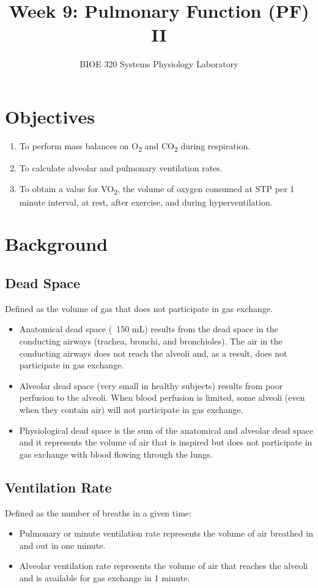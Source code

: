\documentclass{article}
\title{Week 9: Pulmonary Function (PF) II}
\author{BIOE 320 Systems Physiology Laboratory}
\date{}
\begin{document}
\large
\maketitle

\section*{Objectives}
\begin{enumerate}
	\item To perform mass balances on O\textsubscript{2} and CO\textsubscript{2} during respiration.
	\item To calculate alveolar and pulmonary ventilation rates.
	\item To obtain a value for VO\textsubscript{2}, the volume of oxygen consumed at STP per 1 minute interval, at rest, after exercise, and during hyperventilation.
\end{enumerate}

\section*{Background}
\subsection*{Dead Space}
Defined as the volume of gas that does not participate in gas exchange.
\begin{itemize}
	\item Anatomical dead space (~150 mL) results from the dead space in the conducting airways (trachea, bronchi, and bronchioles). The air in the conducting airways does not reach the alveoli and, as a result, does not participate in gas exchange.
	\item Alveolar dead space (very small in healthy subjects) results from poor perfusion to the alveoli. When blood perfusion is limited, some alveoli (even when they contain air) will not participate in gas exchange.
	\item Physiological dead space is the sum of the anatomical and alveolar dead space and it represents the volume of air that is inspired but does not participate in gas exchange with blood flowing through the lungs.
\end{itemize}

\subsection*{Ventilation Rate}
Defined as the number of breaths in a given time:
\begin{itemize}
	\item Pulmonary or minute ventilation rate represents the volume of air breathed in and out in one minute.
	\item Alveolar ventilation rate represents the volume of air that reaches the alveoli and is available for gas exchange in 1 minute.
\end{itemize}
\end{document}

